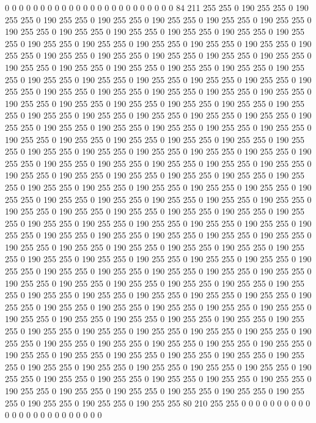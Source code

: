 0 0 0 0 0 0 0 0 0 0 0 0 0 0 0 0 0 0 0 0 0 0 0 0 84 211 255 255 0 190 255 255 0 190 255 255 0 190 255 255 0 190 255 255 0 190 255 255 0 190 255 255 0 190 255 255 0 190 255 255 0 190 255 255 0 190 255 255 0 190 255 255 0 190 255 255 0 190 255 255 0 190 255 255 0 190 255 255 0 190 255 255 0 190 255 255 0 190 255 255 0 190 255 255 0 190 255 255 0 190 255 255 0 190 255 255 0 190 255 255 0 190 255 255 0 190 255 255 0 190 255 255 0 190 255 255 0 190 255 255 0 190 255 255 0 190 255 255 0 190 255 255 0 190 255 255 0 190 255 255 0 190 255 255 0 190 255 255 0 190 255 255 0 190 255 255 0 190 255 255 0 190 255 255 0 190 255 255 0 190 255 255 0 190 255 255 0 190 255 255 
0 190 255 255 0 190 255 255 0 190 255 255 0 190 255 255 0 190 255 255 0 190 255 255 0 190 255 255 0 190 255 255 0 190 255 255 0 190 255 255 0 190 255 255 0 190 255 255 0 190 255 255 0 190 255 255 0 190 255 255 0 190 255 255 0 190 255 255 0 190 255 255 0 190 255 255 0 190 255 255 0 190 255 255 0 190 255 255 0 190 255 255 0 190 255 255 0 190 255 255 0 190 255 255 0 190 255 255 0 190 255 255 0 190 255 255 0 190 255 255 0 190 255 255 0 190 255 255 0 190 255 255 0 190 255 255 0 190 255 255 0 190 255 255 0 190 255 255 0 190 255 255 0 190 255 255 0 190 255 255 0 190 255 255 0 190 255 255 0 190 255 255 0 190 255 255 0 190 255 255 0 190 255 255 0 190 255 255 0 190 255 255 0 190 255 255 0 190 255 255 
0 190 255 255 0 190 255 255 0 190 255 255 0 190 255 255 0 190 255 255 0 190 255 255 0 190 255 255 0 190 255 255 0 190 255 255 0 190 255 255 0 190 255 255 0 190 255 255 0 190 255 255 0 190 255 255 0 190 255 255 0 190 255 255 0 190 255 255 0 190 255 255 0 190 255 255 0 190 255 255 0 190 255 255 0 190 255 255 0 190 255 255 0 190 255 255 0 190 255 255 0 190 255 255 0 190 255 255 0 190 255 255 0 190 255 255 0 190 255 255 0 190 255 255 0 190 255 255 0 190 255 255 0 190 255 255 0 190 255 255 0 190 255 255 0 190 255 255 0 190 255 255 0 190 255 255 0 190 255 255 0 190 255 255 0 190 255 255 0 190 255 255 0 190 255 255 0 190 255 255 0 190 255 255 0 190 255 255 0 190 255 255 0 190 255 255 0 190 255 255 
0 190 255 255 0 190 255 255 0 190 255 255 0 190 255 255 0 190 255 255 0 190 255 255 0 190 255 255 0 190 255 255 0 190 255 255 0 190 255 255 0 190 255 255 0 190 255 255 0 190 255 255 0 190 255 255 0 190 255 255 0 190 255 255 0 190 255 255 0 190 255 255 0 190 255 255 0 190 255 255 0 190 255 255 0 190 255 255 0 190 255 255 0 190 255 255 0 190 255 255 0 190 255 255 0 190 255 255 0 190 255 255 0 190 255 255 0 190 255 255 0 190 255 255 0 190 255 255 0 190 255 255 0 190 255 255 0 190 255 255 0 190 255 255 0 190 255 255 0 190 255 255 0 190 255 255 0 190 255 255 0 190 255 255 0 190 255 255 0 190 255 255 80 210 255 255 0 0 0 0 0 0 0 0 0 0 0 0 0 0 0 0 0 0 0 0 0 0 0 0 
